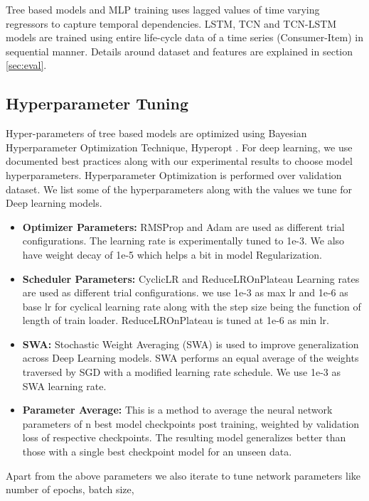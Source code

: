 Tree based models and MLP training uses lagged values of time varying regressors
to capture temporal dependencies. LSTM, TCN and TCN-LSTM models are trained using entire life-cycle data of a 
time series (Consumer-Item) in sequential manner. Details around dataset and features are explained in section \ref{sec:eval}. 

\subsection{Hyperparameter Tuning}
Hyper-parameters of tree based models are optimized
using Bayesian Hyperparameter Optimization Technique, Hyperopt \cite{bergstra2013hyperopt}. 
For deep learning, we use documented best practices along with our experimental results to
choose model hyperparameters. Hyperparameter Optimization is performed over validation dataset. 
We list some of the hyperparameters along with the values we tune for Deep learning models.
  \begin{itemize}
    \item {\bf Optimizer Parameters:} RMSProp \cite{bengio2015rmsprop} and Adam are used as different trial configurations. 
    The learning rate is experimentally tuned to 1e-3. We also have weight decay of 1e-5 which helps a bit in model Regularization.
    \item {\bf Scheduler Parameters:} CyclicLR \cite{smith2017cyclical} and ReduceLROnPlateau \cite{zaheer2018adaptive} 
    Learning rates are used as different trial configurations.
    we use 1e-3 as max lr and 1e-6 as base lr for cyclical learning rate along with the step size being the function of
    length of train loader. ReduceLROnPlateau is tuned at 1e-6 as min lr.
    \item {\bf SWA:} Stochastic Weight Averaging (SWA) \cite{izmailov2018averaging} is used to improve generalization across Deep Learning
    models. SWA performs an equal average of the weights traversed by SGD with a modified learning rate schedule. We use 
    1e-3 as SWA learning rate.
    \item {\bf Parameter Average:} This is a method to average the neural network parameters of n best model checkpoints 
    post training, weighted by validation loss of respective checkpoints. The resulting model generalizes better than those 
    with a single best checkpoint model for an unseen data. 
  \end{itemize}
Apart from the above parameters we also iterate to tune network parameters like number of epochs, batch size, 
